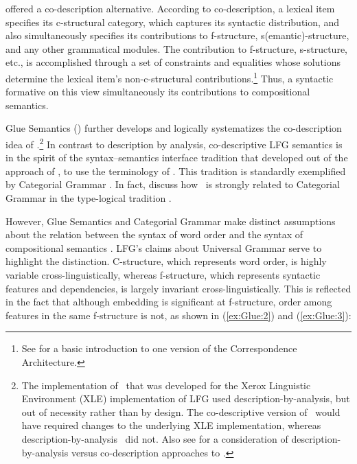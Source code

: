 \documentclass[output=paper,hidelinks]{langscibook}
\begin{document}
\citet{HalvorsenKaplan1988} offered a co-description
alternative. According to co-description, a lexical item specifies its c-structural
category, which captures its syntactic distribution, and also
simultaneously specifies its contributions to f-structure,
s(emantic)-structure, and any other grammatical modules. The
contribution to f-structure, s-structure, etc., is
accomplished through a set of constraints and equalities whose
solutions determine the lexical item's non-c-struc\-tural
contributions.\footnote{See \citet[][ch.\,3]{Asudeh12} for a basic
introduction to one version of the Correspondence Architecture.} Thus,
a syntactic formative on this view simultaneously 
its contributions to compositional semantics.

\begin{sloppypar}
  Glue Semantics (\glue) further develops and logically systematizes
  the co-description idea of
  \citet{HalvorsenKaplan1988}.\footnote{The implementation of
    \glue\ that was developed for the Xerox Linguistic Environment
    (XLE) implementation of LFG  \citep{xledoc} used
    description-by-analysis, but out of necessity rather than by
    design. The co-descriptive version of \glue\ would have required
    changes to the underlying XLE implementation, whereas description-by-analysis
  \glue\ did not. Also see \citet{andrews2008} for a consideration of
  description-by-analysis versus co-description approaches to \glue.}   In
  contrast to description by analysis, co-descriptive LFG semantics is
  in the spirit of the syntax--semantics interface tradition that
  developed out of the  approach of
  \citet{montague73}, to use the terminology of \citet{bach:extension}. This
  tradition is standardly exemplified by Categorial Grammar \citep[CG;
  for a basic overview and foundational references, see][]{wood93}. In
  fact, \citet{dalrymple;ea99c} discuss how \glue\ is strongly related
  to Categorial Grammar in the type-logical tradition \citep[for
  overviews and further references, see
  e.g.,][]{carpenter97,morrill1994,morrill11,moortgat97}.
\end{sloppypar}

However, Glue Semantics and Categorial Grammar make distinct
assumptions about the relation between the syntax of word order and
the syntax of  compositional semantics \citep[for discussion and further references
on this aspect of CG, see][]{steedman14b}. LFG's claims about
Universal Grammar \citep[ch.\,4]{BresnanEtAl2016} serve to 
highlight the distinction. C-structure, which represents word order, is highly variable
cross-linguistically, whereas f-structure, which represents syntactic
features and dependencies, is largely invariant
cross-linguistically. This is reflected in the fact that although
embedding is significant at f-structure, order among features in the
same f-structure is not, as shown in (\ref{ex:Glue:2}) and (\ref{ex:Glue:3}):
\end{document}
